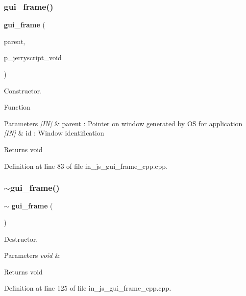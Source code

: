 \subsubsection{gui\_frame()}
{\footnotesize\ttfamily \textbf{ gui\+\_\+frame} (\begin{DoxyParamCaption}\item[{wx\+Window $\ast$}]{parent,  }\item[{void $\ast$}]{p\+\_\+jerryscript\+\_\+void }\end{DoxyParamCaption})}



Constructor. 

Function
\begin{DoxyParams}{Parameters}
{\em \mbox{[}\+I\+N\mbox{]}} & parent \+: Pointer on window generated by OS for application \\
\hline
{\em \mbox{[}\+I\+N\mbox{]}} & id \+: Window identification \\
\hline
\end{DoxyParams}
\begin{DoxyReturn}{Returns}
void 
\end{DoxyReturn}


Definition at line 83 of file in\+\_\+js\+\_\+gui\+\_\+frame\+\_\+cpp.\+cpp.

\mbox{\label{group___g_u_i_ga32e813f8ed38407051e52cd80aab9895}} 
\subsubsection{$\sim$gui\_frame()}
{\footnotesize\ttfamily $\sim$\textbf{ gui\+\_\+frame} (\begin{DoxyParamCaption}{ }\end{DoxyParamCaption})\hspace{0.3cm}{\ttfamily [virtual]}}



Destructor. 


\begin{DoxyParams}{Parameters}
{\em void} & \\
\hline
\end{DoxyParams}
\begin{DoxyReturn}{Returns}
void 
\end{DoxyReturn}


Definition at line 125 of file in\+\_\+js\+\_\+gui\+\_\+frame\+\_\+cpp.\+cpp.




